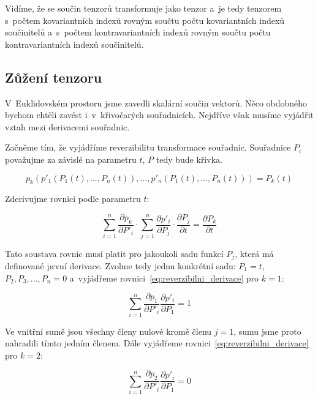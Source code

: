 Vidíme, že se součin tenzorů transformuje jako tenzor a~je tedy tenzorem s~počtem kovariantních indexů rovným součtu počtu kovariantních indexů součinitelů a~s~počtem kontravariantních indexů rovným součtu počtu kontravariantních indexů součinitelů. 

\subsection{Zůžení tenzoru}

V~Euklidovském prostoru jsme zavedli skalární součin vektorů. Něco obdobného bychom chtěli zavést i~v~křivočarých souřadnicích. Nejdříve však musíme vyjádřit vztah mezi derivacemi souřadnic.

Začněme tím, že vyjádříme reverzibilitu transformace souřadnic. Souřadnice \(P_i\) považujme za závislé na parametru \(t\), \(P\) tedy bude křivka.

\begin{equation}
p_k(p'_1(P_1(t), ..., P_n(t)), ..., p'_n(P_1(t), ..., P_n(t))) = P_k(t)
\end{equation}

Zderivujme rovnici podle parametru \(t\):

\begin{equation}
\label{eq:reverzibilni_derivace}
\sum_{i=1}^n \frac{\partial p_k}{\partial P'_i} \cdot \sum_{j=1}^n \frac{\partial p'_i}{\partial P_j} \cdot \frac{\partial P_j}{\partial t} = \frac{\partial P_k}{\partial t}
\end{equation}

Tato soustava rovnic musí platit pro jakoukoli sadu funkcí \(P_j\), která má definované první derivace. Zvolme tedy jednu konkrétní sadu: \(P_1 = t\), \(P_2, P_3, ..., P_n = 0\) a~vyjádřeme rovnici~\eqref{eq:reverzibilni_derivace} pro \(k = 1\):

\begin{equation}
\sum_{i=1}^n \frac{\partial p_1}{\partial P'_i} \frac{\partial p'_i}{\partial P_1} = 1
\end{equation}

Ve vnitřní sumě jsou všechny členy nulové kromě členu \(j = 1\), sumu jsme proto nahradili tímto jedním členem.
Dále vyjádřeme rovnici~\eqref{eq:reverzibilni_derivace} pro \(k = 2\):

\begin{equation}
\sum_{i=1}^n \frac{\partial p_2}{\partial P'_i} \frac{\partial p'_i}{\partial P_1} = 0
\end{equation}

